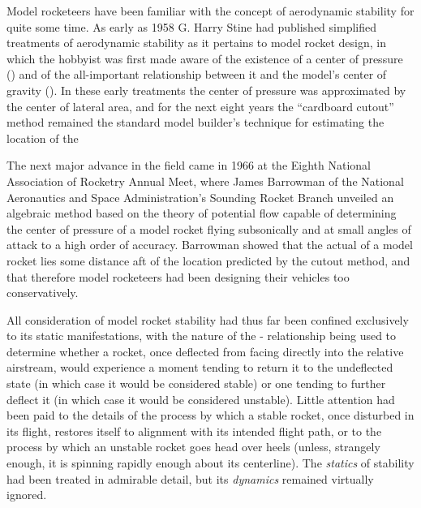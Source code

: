 \label{ch2:sec:intro}

Model rocketeers have been familiar with the concept of aerodynamic stability
for quite some time. As early as 1958 G. Harry Stine had published simplified
treatments of aerodynamic stability as it pertains to model rocket design, in
which the hobbyist was first made aware of the existence of a center of
pressure (\CP) and of the all-important relationship between it and the model's
center of gravity (\CG). In these early treatments the center of pressure was
approximated by the center of lateral area, and for the next eight years the
``cardboard cutout'' method remained the standard model builder's technique for
estimating the location of the \CP

The next major advance in the field came in 1966 at the Eighth National
Association of Rocketry Annual Meet, where James Barrowman of the National
Aeronautics and Space Administration's Sounding Rocket Branch unveiled an
algebraic method based on the theory of potential flow capable of determining
the center of pressure of a model rocket flying subsonically and at small
angles of attack to a high order of accuracy. Barrowman showed that the actual
\CP{} of a model rocket lies some distance aft of the location predicted by the
cutout method, and that therefore model rocketeers had been designing their
vehicles too conservatively.

All consideration of model rocket stability had thus far been confined
exclusively to its static manifestations, with the nature of the \CP-\CG{}
relationship being used to determine whether a rocket, once deflected from
facing directly into the relative airstream, would experience a moment tending
to return it to the undeflected state (in which case it would be considered
stable) or one tending to further deflect it (in which case it would be
considered unstable). Little attention had been paid to the details of the
process by which a stable rocket, once disturbed in its flight, restores itself
to alignment with its intended flight path, or to the process by which an
unstable rocket goes head over heels (unless, strangely enough, it is spinning
rapidly enough about its centerline). The \emph{statics} of stability had been
treated in admirable detail, but its \emph{dynamics} remained virtually
ignored.

